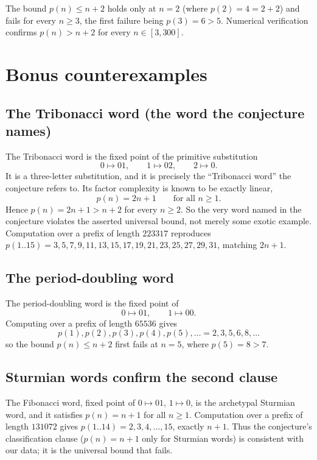 \documentclass[11pt]{article}
\theoremstyle{definition}
\theoremstyle{remark}
\begin{document}
The bound $p(n) \le n+2$ holds only at $n = 2$ (where $p(2) = 4 = 2+2$) and
fails for every $n \ge 3$, the first failure being $p(3) = 6 > 5$. Numerical
verification confirms $p(n) > n+2$ for every $n \in [3,300]$.

\section{Bonus counterexamples}

\subsection{The Tribonacci word (the word the conjecture names)}

The Tribonacci word is the fixed point of the primitive substitution
\[
0 \mapsto 01,\qquad 1 \mapsto 02,\qquad 2 \mapsto 0 .
\]
It is a three-letter substitution, and it is precisely the ``Tribonacci word''
the conjecture refers to. Its factor complexity is known to be exactly linear,
\[
p(n) = 2n+1 \qquad \text{for all } n \ge 1 .
\]
Hence $p(n) = 2n+1 > n+2$ for every $n \ge 2$. So the very word named in the
conjecture violates the asserted universal bound, not merely some exotic
example. Computation over a prefix of length $223317$ reproduces
$p(1..15) = 3,5,7,9,11,13,15,17,19,21,23,25,27,29,31$, matching $2n+1$.

\subsection{The period-doubling word}

The period-doubling word is the fixed point of
\[
0 \mapsto 01,\qquad 1 \mapsto 00 .
\]
Computing over a prefix of length $65536$ gives
\[
p(1),p(2),p(3),p(4),p(5),\dots = 2,3,5,6,8,\dots
\]
so the bound $p(n) \le n+2$ first fails at $n = 5$, where $p(5) = 8 > 7$.

\subsection{Sturmian words confirm the second clause}

The Fibonacci word, fixed point of $0 \mapsto 01$, $1 \mapsto 0$, is the
archetypal Sturmian word, and it satisfies $p(n) = n+1$ for all $n \ge 1$.
Computation over a prefix of length $131072$ gives
$p(1..14) = 2,3,4,\dots,15$, exactly $n+1$. Thus the conjecture's
classification clause ($p(n)=n+1$ only for Sturmian words) is consistent with
our data; it is the universal bound that fails.
\end{document}
